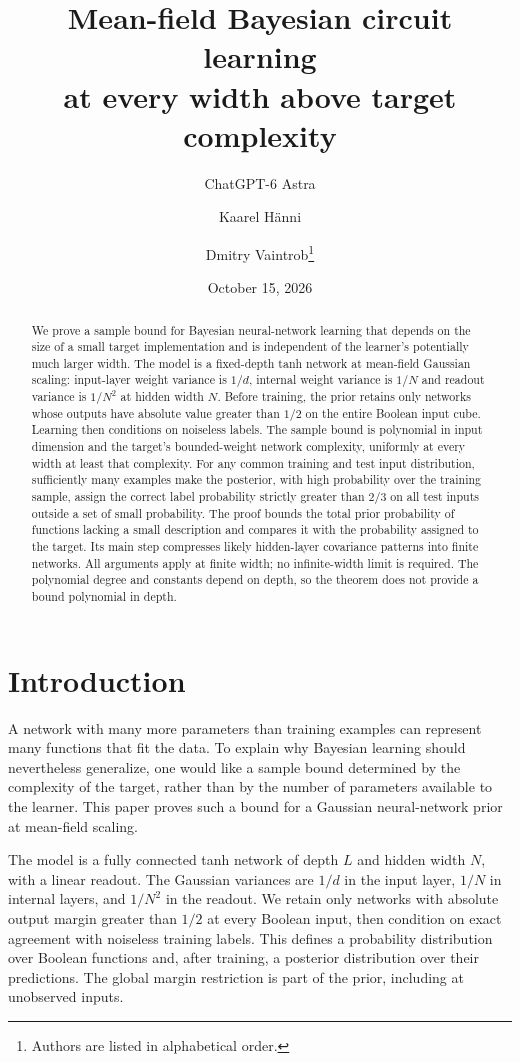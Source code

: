 \documentclass[11pt]{article}
\title{Mean-field Bayesian circuit learning\\at every width above target complexity}
\author{ChatGPT-6 Astra \and Kaarel H\"anni \and Dmitry Vaintrob\thanks{Authors are listed in alphabetical order.}}
\date{October 15, 2026}
\theoremstyle{remark}\newtheorem{remark}[theorem]{Remark}
\begin{document}
\maketitle
\begin{abstract}
We prove a sample bound for Bayesian neural-network learning that depends
on the size of a small target implementation and is independent of the
learner's potentially much larger width. The model is a fixed-depth tanh
network at mean-field Gaussian scaling: input-layer weight variance is
$1/d$, internal weight variance is $1/N$
and readout variance is $1/N^2$
at hidden width $N$. Before training, the prior retains only networks whose
outputs have absolute value greater than $1/2$ on the entire Boolean input
cube. Learning then conditions on noiseless labels. The sample bound is
polynomial in input dimension and the target's bounded-weight network
complexity, uniformly at every width at least that complexity. For any
common training and test input distribution, sufficiently many examples
make the posterior, with high probability over the training sample, assign
the correct label probability strictly greater than $2/3$ on all test inputs
outside a set of small probability.
The proof bounds the total prior probability of functions lacking a small
description and compares it with the probability assigned to the target.
Its main step compresses likely hidden-layer covariance patterns into
finite networks. All arguments apply at finite width; no infinite-width
limit is required. The polynomial degree and constants depend on depth,
so the theorem does not provide a bound polynomial in depth.
\end{abstract}

\section{Introduction}
A network with many more parameters than training examples can represent
many functions that fit the data. To explain why Bayesian learning should
nevertheless generalize, one would like a sample bound determined by the
complexity of the target, rather than by the number of parameters available
to the learner. This paper proves such a bound for a Gaussian neural-network
prior at mean-field scaling.

The model is a fully connected tanh network of depth $L$ and hidden width
$N$, with a linear readout. The Gaussian variances are $1/d$ in the input
layer, $1/N$ in internal layers, and $1/N^2$ in the readout. We retain only
networks with absolute output margin greater than $1/2$ at every Boolean
input, then condition on exact agreement with noiseless training labels.
This defines a probability distribution over Boolean functions and, after
training, a posterior distribution over their predictions. The global
margin restriction is part of the prior, including at unobserved inputs.
\end{document}
